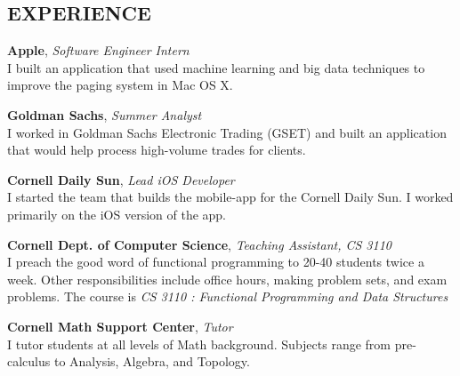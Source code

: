 \documentclass[line,margin]{res}
\begin{document}
\address{212 Linden Ave, Apt. 3, Ithaca, NY 14853}
\address{{\bf Phone:} (845) 664-5697 {\bf Email:} bkc39@cornell.edu}

\begin{resume}
  \section{EXPERIENCE}
  {\bf Apple}, {\textit{Software Engineer Intern}} \\
  I built an application that used machine learning and big data
  techniques to improve the paging system in Mac OS X.
  \vspace{-1em}

  {\bf Goldman Sachs}, {\textit{Summer Analyst}} \\
  I worked in Goldman Sachs Electronic Trading (GSET) and built an
  application that would help process high-volume trades for clients.
  \vspace{-1em}

  {\bf Cornell Daily Sun}, {\textit{Lead iOS Developer}} \\
  I started the team that builds the mobile-app for the Cornell Daily
  Sun. I worked primarily on the iOS version of the app.
  \vspace{-1em}

  {\bf Cornell Dept. of Computer Science}, \textit{Teaching Assistant,
    CS 3110} \\
  I preach the good word of functional programming to 20-40 students
  twice a week. Other responsibilities include office hours, making
  problem sets, and exam problems. The course is {\it CS 3110 : Functional
  Programming and Data Structures}
  \vspace{-1em}

  {\bf Cornell Math Support Center}, \textit{Tutor} \\
  I tutor students at all levels of Math background. Subjects range
  from pre-calculus to Analysis, Algebra, and Topology.


\end{resume}
\end{document}
